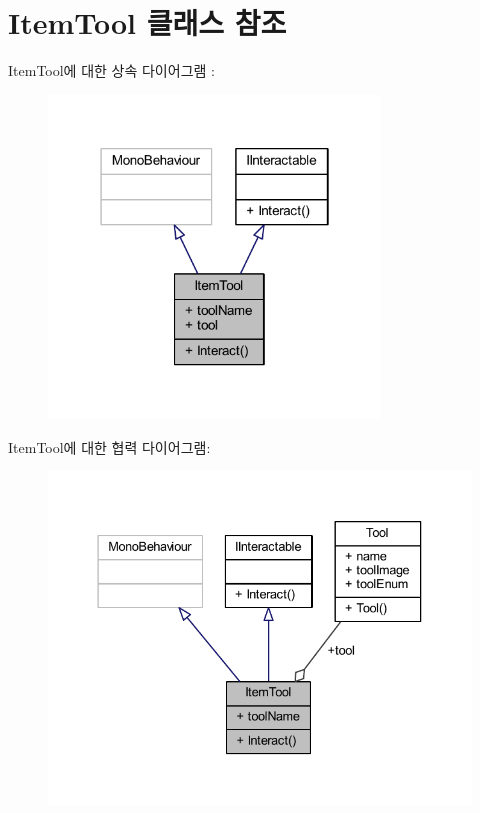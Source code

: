 \hypertarget{class_item_tool}{}\section{Item\+Tool 클래스 참조}
\label{class_item_tool}


Item\+Tool에 대한 상속 다이어그램 \+: \nopagebreak
\begin{figure}[H]
\begin{center}
\leavevmode
\includegraphics[width=250pt]{da/d5d/class_item_tool__inherit__graph}
\end{center}
\end{figure}


Item\+Tool에 대한 협력 다이어그램\+:\nopagebreak
\begin{figure}[H]
\begin{center}
\leavevmode
\includegraphics[width=337pt]{d9/ddc/class_item_tool__coll__graph}
\end{center}
\end{figure}
